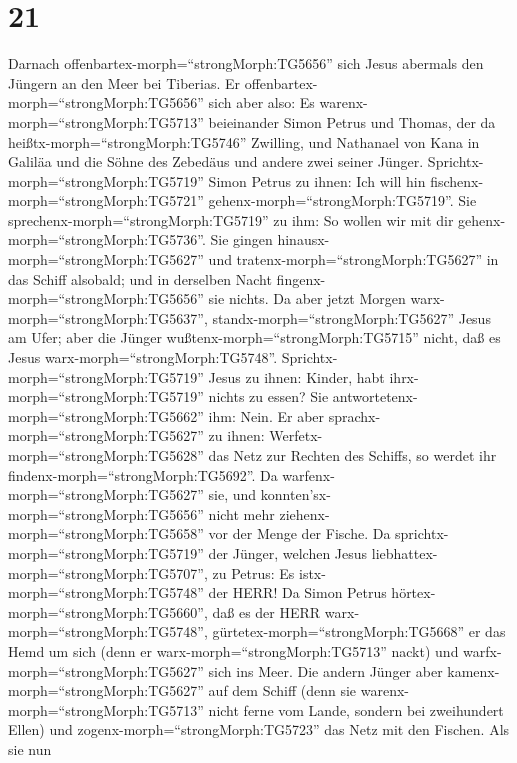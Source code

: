 \hypertarget{section-20}{%
\section{21}\label{section-20}}

 Darnach offenbartex-morph=``strongMorph:TG5656'' sich Jesus
abermals den Jüngern an den Meer bei Tiberias. Er
offenbartex-morph=``strongMorph:TG5656'' sich aber also:  Es
warenx-morph=``strongMorph:TG5713'' beieinander Simon Petrus und Thomas,
der da heißtx-morph=``strongMorph:TG5746'' Zwilling, und Nathanael von
Kana in Galiläa und die Söhne des Zebedäus und andere zwei seiner
Jünger.  Sprichtx-morph=``strongMorph:TG5719'' Simon Petrus
zu ihnen: Ich will hin fischenx-morph=``strongMorph:TG5721''
gehenx-morph=``strongMorph:TG5719''. Sie
sprechenx-morph=``strongMorph:TG5719'' zu ihm: So wollen wir mit dir
gehenx-morph=``strongMorph:TG5736''. Sie gingen
hinausx-morph=``strongMorph:TG5627'' und
tratenx-morph=``strongMorph:TG5627'' in das Schiff alsobald; und in
derselben Nacht fingenx-morph=``strongMorph:TG5656'' sie nichts.
 Da aber jetzt Morgen warx-morph=``strongMorph:TG5637'',
standx-morph=``strongMorph:TG5627'' Jesus am Ufer; aber die Jünger
wußtenx-morph=``strongMorph:TG5715'' nicht, daß es Jesus
warx-morph=``strongMorph:TG5748''. 
Sprichtx-morph=``strongMorph:TG5719'' Jesus zu ihnen: Kinder, habt
ihrx-morph=``strongMorph:TG5719'' nichts zu essen? Sie
antwortetenx-morph=``strongMorph:TG5662'' ihm: Nein.  Er
aber sprachx-morph=``strongMorph:TG5627'' zu ihnen:
Werfetx-morph=``strongMorph:TG5628'' das Netz zur Rechten des Schiffs,
so werdet ihr findenx-morph=``strongMorph:TG5692''. Da
warfenx-morph=``strongMorph:TG5627'' sie, und
konnten'sx-morph=``strongMorph:TG5656'' nicht mehr
ziehenx-morph=``strongMorph:TG5658'' vor der Menge der Fische.
 Da sprichtx-morph=``strongMorph:TG5719'' der Jünger,
welchen Jesus liebhattex-morph=``strongMorph:TG5707'', zu Petrus: Es
istx-morph=``strongMorph:TG5748'' der HERR! Da Simon Petrus
hörtex-morph=``strongMorph:TG5660'', daß es der HERR
warx-morph=``strongMorph:TG5748'', gürtetex-morph=``strongMorph:TG5668''
er das Hemd um sich (denn er warx-morph=``strongMorph:TG5713'' nackt)
und warfx-morph=``strongMorph:TG5627'' sich ins Meer.  Die
andern Jünger aber kamenx-morph=``strongMorph:TG5627'' auf dem Schiff
(denn sie warenx-morph=``strongMorph:TG5713'' nicht ferne vom Lande,
sondern bei zweihundert Ellen) und zogenx-morph=``strongMorph:TG5723''
das Netz mit den Fischen.  Als sie nun

